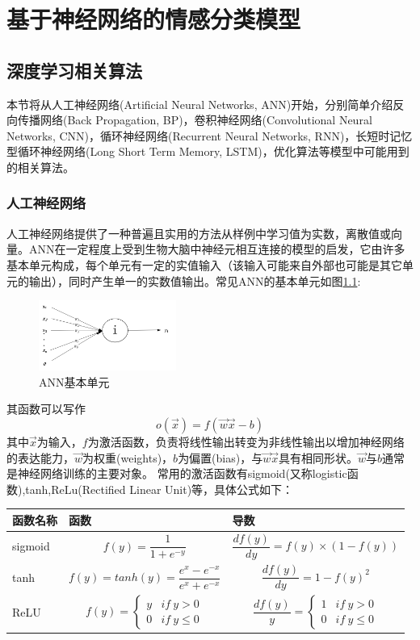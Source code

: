 \chapter{基于神经网络的情感分类模型}
\section{深度学习相关算法}
本节将从人工神经网络(Artificial Neural Networks, ANN)开始，分别简单介绍反向传播网络(Back Propagation, BP)，卷积神经网络(Convolutional Neural Networks, CNN)，循环神经网络(Recurrent Neural Networks, RNN)，长短时记忆型循环神经网络(Long Short Term Memory, LSTM)，优化算法等模型中可能用到的相关算法。
\subsection{人工神经网络}
人工神经网络提供了一种普遍且实用的方法从样例中学习值为实数，离散值或向量。ANN在一定程度上受到生物大脑中神经元相互连接的模型的启发，它由许多基本单元构成，每个单元有一定的实值输入（该输入可能来自外部也可能是其它单元的输出），同时产生单一的实数值输出。常见ANN的基本单元如图\ref{ann1}:
\begin{figure}[!hbp]
\begin{center}
\includegraphics[width=0.4\textwidth]{graphic/ann1.png}
\caption{ANN基本单元\cite{ml2006} \label{ann1}}
\end{center}
\end{figure}
其函数可以写作
\begin{equation}
o(\vec{x}) = f(\vec{w} \vec{x} - b)
\end{equation}
其中$\vec{x}$为输入，$f$为激活函数，负责将线性输出转变为非线性输出以增加神经网络的表达能力，$\vec{w}$为权重(weights)，$b$为偏置(bias)，与$\vec{w} \vec{x} $具有相同形状。$\vec{w}$与$b$通常是神经网络训练的主要对象。
常用的激活函数有sigmoid(又称logistic函数),tanh,ReLu(Rectified Linear Unit)等，具体公式如下：
\begin{center}
\begin{tabu}  to 0.8\textwidth{X|X[3]|X[3]}
\hline
函数名称 & 函数 & 导数 \\
\hline
sigmoid &
$$
f(y) = \frac{1}{1 + e^{-y}}
$$
&
$$
\frac{df(y)}{dy} = f(y) \times (1 - f(y))
$$
\\ \hline
tanh &
$$
f(y) = tanh(y) = \frac{e^x - e^{-x}}{e^x + e^{-x}}
$$
&
$$
\frac{df(y)}{dy} = 1 - {f(y)}^2
$$
\\ \hline
ReLU &
$$
f(y) = \left\{\begin{matrix}
y & if\ y > 0\\ 
0 & if\ y \leq 0
\end{matrix}\right.
$$
&
$$
\frac{df(y)}{y} = \left\{\begin{matrix}
1 & if\ y > 0\\ 
0 & if\ y \leq 0
\end{matrix}\right.
$$
\\ \hline
\end{tabu}
\end{center}
